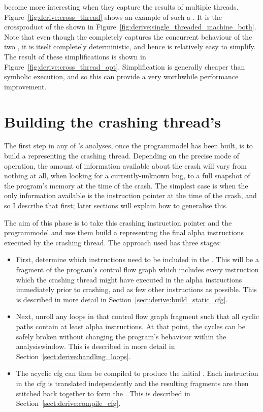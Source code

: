 {\STateMachines} become more interesting when they capture the results
of multiple threads.  Figure~\ref{fig:derive:cross_thread} shows an
example of such a {\StateMachine}.  It is the \gls{crossproduct} of
the {\StateMachines} shown in
Figure~\ref{fig:derive:single_threaded_machine_both}.  Note that even
though the {\StateMachine} completely captures the concurrent
behaviour of the two {\StateMachines}, it is itself completely
deterministic, and hence is relatively easy to simplify.  The result
of these simplifications is shown in
Figure~\ref{fig:derive:cross_thread_opt}.  Simplification is generally
cheaper than symbolic execution, and so this can provide a very
worthwhile performance improvement.

\section{Building the crashing thread's \StateMachine}

The first step in any of {\technique}'s analyses, once the
\gls{programmodel} has been built, is to build a {\StateMachine}
representing the crashing thread.  Depending on the precise mode of
operation, the amount of information available about the crash will
vary from nothing at all, when looking for a currently-unknown bug, to
a full snapshot of the program's memory at the time of the crash.  The
simplest case is when the only information available is the
instruction pointer at the time of the crash, and so I describe that
first; later sections will explain how to generalise this.

The aim of this phase is to take this crashing instruction pointer and
the \gls{programmodel} and use them build a {\StateMachine}
representing the final \gls{alpha} instructions executed by the
crashing thread.  The approach used has three stages:

\begin{itemize}
\item First, determine which instructions need to be included in the
  {\StateMachine}.  This will be a fragment of the program's control
  flow graph which includes every instruction which the crashing
  thread might have executed in the \gls{alpha} instructions
  immediately prior to crashing, and as few other instructions as
  possible.  This is described in more detail in
  Section~\ref{sect:derive:build_static_cfg}.
\item Next, unroll any loops in that control flow graph fragment such
  that all cyclic paths contain at least \gls{alpha}
  instructions.  At that point, the cycles can be safely broken
  without changing the program's behaviour within the
  \gls{analysiswindow}.  This is described in more detail in
  Section~\ref{sect:derive:handling_loops}.
\item The acyclic \gls{cfg} can then be compiled to produce the
  initial {\StateMachine}.  Each instruction in the \gls{cfg} is
  translated independently and the resulting fragments are then
  stitched back together to form the {\StateMachine}.  This is
  described in Section~\ref{sect:derive:compile_cfg}.
\end{itemize}


